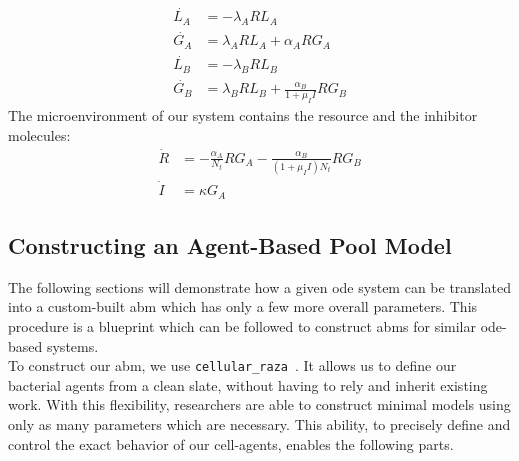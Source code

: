 \documentclass[10pt,A4paper]{article}
\numberwithin{equation}{section}
\begin{document}
%
\begin{align}
    \dot{L_A} &= -\lambda_A R L_A\\
    \dot{G_A} &= \lambda_A R L_A + \alpha_A R G_A\\
    \dot{L_B} &= -\lambda_B R L_B\\
    \dot{G_B} &= \lambda_B R L_B + \frac{\alpha_B}{1 + \mu_I I} R G_B
    \label{eq:spatial_limit_F}
\end{align}
%
The microenvironment of our system contains the resource and the inhibitor molecules:
\begin{align}
    \dot{R} &= -\frac{\alpha_A}{N_t} R G_A-\frac{\alpha_B}{(1 + \mu_I I) N_t} R G_B \\
    \dot{I} &= \kappa G_A
    \label{eq:spatial_limit_H}
\end{align}

\subsection{Constructing an Agent-Based Pool Model}
The following sections will demonstrate how a given \ac{ode} system can be translated into a
custom-built \ac{abm} which has only a few more overall parameters.
This procedure is a blueprint which can be followed to construct \acp{abm} for similar
\ac{ode}-based systems.\\
To construct our \ac{abm}, we use \texttt{cellular\_raza}~\cite{Pleyer2025}.
It allows us to define our bacterial agents from a clean slate, without having to rely and inherit
existing work.
With this flexibility, researchers are able to construct minimal models using only as many parameters which are necessary.
This ability, to precisely define and control the exact behavior of our cell-agents, enables the following parts.
\end{document}
